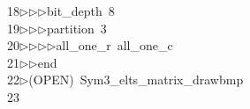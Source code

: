 \begin{tabbing}
18\>$\triangleright$\>$\triangleright$\>$\triangleright$\>bit\_depth\ 8\ \\[0pt]
19\>$\triangleright$\>$\triangleright$\>$\triangleright$\>partition\ 3\ \\[0pt]
20\>$\triangleright$\>$\triangleright$\>$\triangleright$\>$\triangleright$\>all\_one\_r\ all\_one\_c\ \\[0pt]
21\>$\triangleright$\>$\triangleright$\>end\\[0pt]
22\>$\triangleright$\>(OPEN)\ Sym3\_elts\_matrix\_drawbmp\\[0pt]
23\>\end{tabbing}
